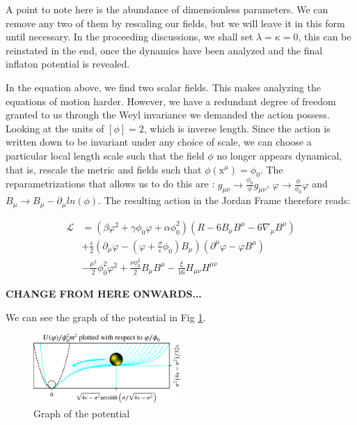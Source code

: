 \documentclass[aps,prd,reprint,preprintnumbers,showpacs,floatfix,nofootinbib,superscript address]{revtex4-2}
\begin{document}
A point to note here is the abundance of dimensionless parameters. We can remove any two of them by rescaling our fields, but we will leave it in this form until necessary. In the proceeding discussions, we shall set $\lambda = \kappa = 0$, this can be reinstated in the end, once the dynamics have been analyzed and the final inflaton potential is revealed.

In the equation above, we find two scalar fields. This makes analyzing the equations of motion harder. However, we have a redundant degree of freedom granted to us through the Weyl invariance we demanded the action possess. Looking at the units of $[\phi] = 2$, which is inverse length. Since the action is written down to be invariant under any choice of scale, we can choose a particular local length scale such that the field $\phi$ no longer appears dynamical, that is, rescale the metric and fields such that $\phi(\text{x}^\mu) = \phi_0$. The reparametrizations that allows us to do this are : $g_{\mu \nu} \rightarrow \frac{\phi_0}{\phi} g_{\mu \nu}$, $\varphi \rightarrow \frac{\phi}{\phi_0} \varphi$ and $B_{\mu} \rightarrow B_{\mu} - \partial_{\mu} ln(\phi)$. The resulting action in the Jordan Frame therefore reads:

\begin{equation}
    \begin{aligned}
        \mathcal{L} &= ( \beta \varphi^2 + \gamma \phi_0 \varphi +\alpha \phi^2_0) (R - 6B_{\mu} B^{\mu} - 6\nabla_\mu B^\mu) \\
        &+ \frac{\epsilon}{2} (\partial_\mu \varphi - (\varphi + \frac{\sigma}{\epsilon} \phi_0)B_\mu)(\partial^\mu \varphi - \varphi B^\mu)\\
        &- \frac{\mu^2}{2} \phi^2_0 \varphi^2 + \frac{\nu \phi_{0}^{2}}{2} B_\mu B^\mu - \frac{\xi}{16} H_{\mu\nu}H^{\mu\nu}
    \end{aligned}
\end{equation}


\textbf{CHANGE FROM HERE ONWARDS...}




We can see the graph of the potential in Fig \ref{Potential from Paper}.
\begin{figure}[h]
    \centering
    \includegraphics[width=0.5\textwidth]{Potential from Paper.png}
    \caption{Graph of the potential \cite{barker2024poincaregaugetheoryconformal}}
    \label{Potential from Paper}
\end{figure}
\end{document}
